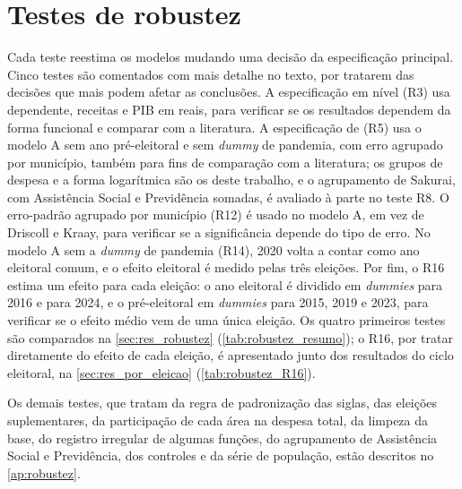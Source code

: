 \section{Testes de robustez}\label{sec:robustez}

Cada teste reestima os modelos mudando uma decisão da especificação principal. Cinco testes são comentados com mais detalhe no texto, por tratarem das decisões que mais podem afetar as conclusões. A especificação em nível (R3) usa dependente, receitas e PIB em reais, para verificar se os resultados dependem da forma funcional e comparar com a literatura. A especificação de \textcite{sakurai2009} (R5) usa o modelo A sem ano pré-eleitoral e sem \textit{dummy} de pandemia, com erro agrupado por município, também para fins de comparação com a literatura; os grupos de despesa e a forma logarítmica são os deste trabalho, e o agrupamento de Sakurai, com Assistência Social e Previdência somadas, é avaliado à parte no teste R8. O erro-padrão agrupado por município (R12) é usado no modelo A, em vez de Driscoll e Kraay, para verificar se a significância depende do tipo de erro. No modelo A sem a \textit{dummy} de pandemia (R14), 2020 volta a contar como ano eleitoral comum, e o efeito eleitoral é medido pelas três eleições. Por fim, o R16 estima um efeito para cada eleição: o ano eleitoral é dividido em \textit{dummies} para 2016 e para 2024, e o pré-eleitoral em \textit{dummies} para 2015, 2019 e 2023, para verificar se o efeito médio vem de uma única eleição. Os quatro primeiros testes são comparados na \autoref{sec:res_robustez} (\autoref{tab:robustez_resumo}); o R16, por tratar diretamente do efeito de cada eleição, é apresentado junto dos resultados do ciclo eleitoral, na \autoref{sec:res_por_eleicao} (\autoref{tab:robustez_R16}).

Os demais testes, que tratam da regra de padronização das siglas, das eleições suplementares, da participação de cada área na despesa total, da limpeza da base, do registro irregular de algumas funções, do agrupamento de Assistência Social e Previdência, dos controles e da série de população, estão descritos no \autoref{ap:robustez}.
